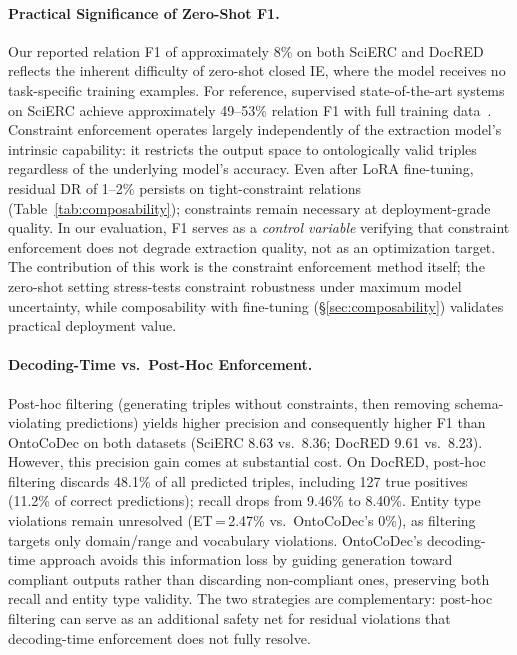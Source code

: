 
\paragraph{Practical Significance of Zero-Shot F1.}
Our reported relation F1 of approximately 8\% on both SciERC and DocRED reflects the inherent difficulty of zero-shot closed IE, where the model receives no task-specific training examples.
For reference, supervised state-of-the-art systems on SciERC achieve approximately 49--53\% relation F1 with full training data~\citep{zhong2021frustratingly,ye2022packed}.
Constraint enforcement operates largely independently of the extraction model's intrinsic capability: it restricts the output space to ontologically valid triples regardless of the underlying model's accuracy.
Even after LoRA fine-tuning, residual DR of 1--2\% persists on tight-constraint relations (Table~\ref{tab:composability}); constraints remain necessary at deployment-grade quality.
In our evaluation, F1 serves as a \emph{control variable} verifying that constraint enforcement does not degrade extraction quality, not as an optimization target.
The contribution of this work is the constraint enforcement method itself; the zero-shot setting stress-tests constraint robustness under maximum model uncertainty, while composability with fine-tuning (\S\ref{sec:composability}) validates practical deployment value.


\paragraph{Decoding-Time vs.\ Post-Hoc Enforcement.}
Post-hoc filtering (generating triples without constraints, then removing schema-violating predictions) yields higher precision and consequently higher F1 than OntoCoDec on both datasets (SciERC 8.63 vs.\ 8.36; DocRED 9.61 vs.\ 8.23).
However, this precision gain comes at substantial cost.
On DocRED, post-hoc filtering discards 48.1\% of all predicted triples, including 127 true positives (11.2\% of correct predictions); recall drops from 9.46\% to 8.40\%.
Entity type violations remain unresolved (ET\,=\,2.47\% vs.\ OntoCoDec's 0\%), as filtering targets only domain/range and vocabulary violations.
OntoCoDec's decoding-time approach avoids this information loss by guiding generation toward compliant outputs rather than discarding non-compliant ones, preserving both recall and entity type validity.
The two strategies are complementary: post-hoc filtering can serve as an additional safety net for residual violations that decoding-time enforcement does not fully resolve.

